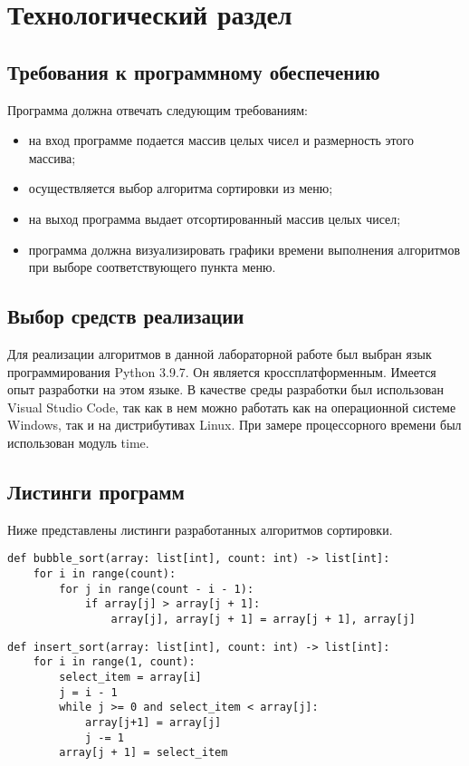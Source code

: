 \chapter{Технологический раздел}
\section{Требования к программному обеспечению}
Программа должна отвечать следующим требованиям:
\begin{itemize}
	\item на вход программе подается массив целых чисел и размерность этого массива;
	\item осуществляется выбор алгоритма сортировки из меню;
	\item на выход программа выдает отсортированный массив целых чисел;
	\item программа должна визуализировать графики времени выполнения алгоритмов при выборе соответствующего пункта меню. 
\end{itemize}

\section{Выбор средств реализации}
Для реализации алгоритмов в данной лабораторной работе был выбран язык программирования Python 3.9.7\cite{python3}. Он является кроссплатформенным. Имеется опыт разработки на этом языке. В качестве среды разработки был использован Visual Studio Code\cite{vs}, так как в нем можно работать как на операционной системе Windows, так и на дистрибутивах Linux. При замере процессорного времени был использован модуль time\cite{time}.
\section{Листинги программ}
Ниже представлены листинги разработанных алгоритмов сортировки.
\newpage
\begin{lstlisting}[label=code1,caption=Программный код сортировки пузырьком.]
def bubble_sort(array: list[int], count: int) -> list[int]:
	for i in range(count):
		for j in range(count - i - 1):
			if array[j] > array[j + 1]:
				array[j], array[j + 1] = array[j + 1], array[j]
\end{lstlisting}

\begin{lstlisting}[label=code2,caption=Программный код сортировки вставками.]
def insert_sort(array: list[int], count: int) -> list[int]:
	for i in range(1, count):
		select_item = array[i]
		j = i - 1
		while j >= 0 and select_item < array[j]:
			array[j+1] = array[j]
			j -= 1
		array[j + 1] = select_item
\end{lstlisting}

